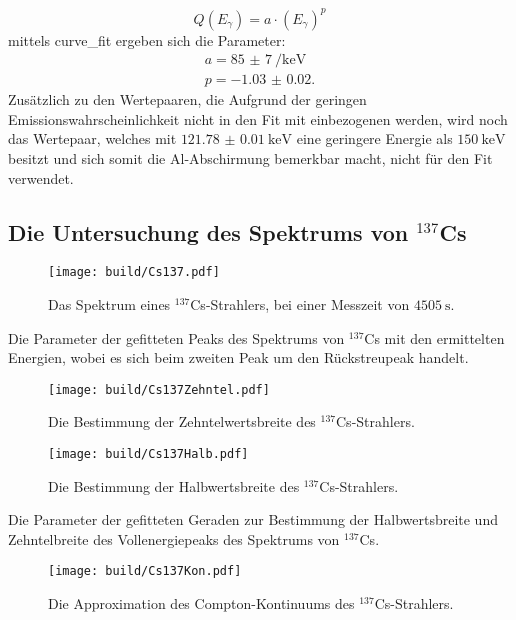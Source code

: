 \begin{equation}
	Q(E_\gamma)=a \cdot (E_\gamma)^p
\end{equation}
mittels curve\_fit \cite{scipy} ergeben sich die Parameter:
\begin{gather*}
    a = \SI{85(7)}{\per\kilo\electronvolt}\\
    p = \num{-1.03(2)}.
\end{gather*}
Zusätzlich zu den Wertepaaren, die Aufgrund der geringen Emissionswahrscheinlichkeit nicht in den Fit mit einbezogenen werden, wird noch das Wertepaar, welches mit $\SI{121.78(1)}{\kilo\electronvolt}$ eine geringere Energie als $\SI{150}{\kilo\electronvolt}$ besitzt und sich somit die Al-Abschirmung bemerkbar macht, nicht für den Fit verwendet.


\subsection{Die Untersuchung des Spektrums von $^{137}$Cs}
\begin{figure}
	\centering
	\texttt{[image: build/Cs137.pdf]}
	\caption{Das Spektrum eines $^{137}$Cs-Strahlers, bei einer Messzeit von $\SI{4505}{\second}$.}
	\label{fig:2}
\end{figure}
\begin{table}
	\centering
	\caption{Die Parameter der gefitteten Peaks des Spektrums von $^{137}$Cs mit den ermittelten Energien, wobei es sich beim zweiten Peak um den Rückstreupeak handelt.}
	
\end{table}
\begin{figure}
	\centering
	\texttt{[image: build/Cs137Zehntel.pdf]}
	\caption{Die Bestimmung der Zehntelwertsbreite des $^{137}$Cs-Strahlers.}
	\label{fig:10tel}
\end{figure}
\begin{figure}
	\centering
	\texttt{[image: build/Cs137Halb.pdf]}
	\caption{Die Bestimmung der Halbwertsbreite des $^{137}$Cs-Strahlers.}
	\label{fig:2tel}
\end{figure}
\begin{table}
	\centering
	\caption{Die Parameter der gefitteten Geraden zur Bestimmung der Halbwertsbreite und Zehntelbreite des Vollenergiepeaks des Spektrums von $^{137}$Cs.}
	
\end{table}
\begin{figure}
	\centering
	\texttt{[image: build/Cs137Kon.pdf]}
	\caption{Die Approximation des Compton-Kontinuums des $^{137}$Cs-Strahlers.}
	\label{fig:Comptonkontinuums}
\end{figure}
